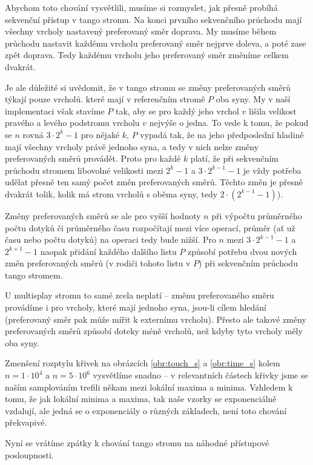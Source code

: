 Abychom toto chování vysvětlili, musíme si rozmyslet, jak přesně probíhá sekvenční přístup v tango stromu. Na konci prvního sekvenčního průchodu mají všechny vrcholy nastavený preferovaný směr doprava. My musíme během průchodu nastavit každému vrcholu preferovaný směr nejprve doleva, a poté zase zpět doprava. Tedy každému vrcholu jeho preferovaný směr změníme celkem dvakrát.

Je ale důležité si uvědomit, že v tango stromu se změny preferovaných směrů
týkají pouze vrcholů. které mají v referenčním stromě $P$ oba syny. My v naší
implementaci však stavíme $P$ tak, aby se pro každý jeho vrchol $v$ lišila
velikost pravého a levého podstromu vrcholu $v$ nejvýše o jedna. To vede k tomu, že pokud se
$n$ rovná $3\cdot2^k-1$ pro nějaké $k$, $P$ vypadá tak, že na jeho předposlední
hladině mají všechny vrcholy právě jednoho syna, a tedy v nich nelze změny
preferovaných směrů provádět. Proto pro každé $k$ platí, že při sekvenčním
průchodu stromem libovolné velikosti mezi $2^k-1$ a $3\cdot 2^{k-1}-1$ je vždy
potřeba udělat přesně ten samý počet změn preferovaných směrů. Těchto změn je přesně
dvakrát tolik, kolik má strom vrcholů s oběma syny, tedy $2\cdot(2^{k-1} -1)$).

Změny preferovaných směrů se ale pro vyšší hodnoty $n$ při výpočtu
průměrného počtu dotyků či průměrného času rozpočítají mezi více operací,
průměr (ať už času nebo počtu dotyků) na operaci tedy bude nižší. Pro $n$
 mezi $3\cdot 2^{k-1}-1$ a $2^{k+1}-1$ naopak přidání každého dalšího listu $P$ způsobí potřebu dvou nových změn preferovaných směrů (v rodiči tohoto listu v $P$) při sekvenčním průchodu tango stromem.

U multisplay stromu to samé zcela neplatí -- změnu preferovaného směru provádíme i pro vrcholy, které mají jednoho syna, jsou-li cílem hledání (preferovaný směr pak může mířit k externímu vrcholu). Přesto ale takové změny preferovaných směrů způsobí doteky méně vrcholů, než kdyby tyto vrcholy měly oba syny.

Zmenšení rozptylu křivek na obrázcích \ref{obr:touch_s} a \ref{obr:time_s} kolem $n=1\cdot 10^4$ a $n=5\cdot 10^6$ vysvětlíme snadno -- v relevantních částech křivky jsme se naším samplováním trefili někam mezi lokální maxima a minima. Vzhledem k tomu, že jak lokální minima a maxima, tak naše vzorky se exponenciálně vzdalují, ale jedná se o exponenciály o různých základech, není toto chování překvapivé.

Nyní se vrátíme zpátky k chování tango stromu na náhodné přístupové
posloupnosti.

